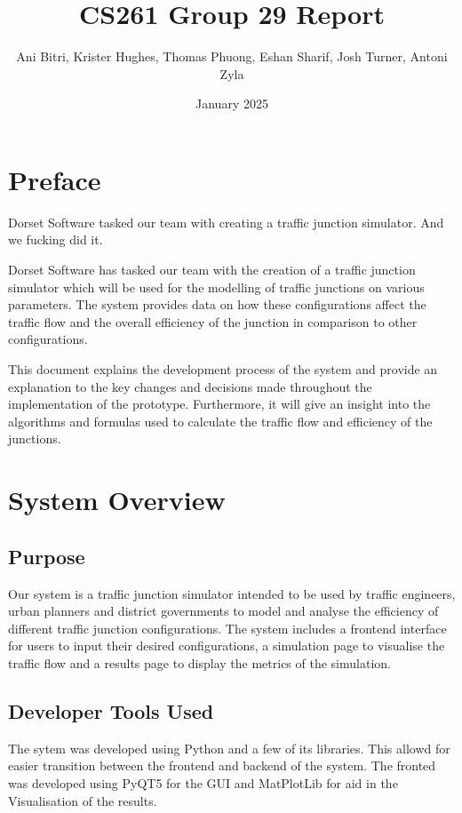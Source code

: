\documentclass{article}
\title{\vspace{-1.5cm}CS261 Group 29 Report}
\author{Ani Bitri, Krister Hughes, Thomas Phuong, Eshan Sharif, Josh Turner, Antoni Zyla}
\date{January 2025}
\begin{document}
\maketitle

\section{Preface}

Dorset Software tasked our team with creating a traffic junction simulator. And we fucking did it. 

Dorset Software has tasked our team with the creation of a traffic junction simulator which will be used for the modelling of traffic junctions on various parameters. The system provides data on how these configurations 
affect the traffic flow and the overall efficiency of the junction in comparison to other configurations. 

This document explains the development process of the system and provide an explanation to the key changes and decisions made throughout the implementation of the prototype. Furthermore,
it will give an insight into the algorithms and formulas used to calculate the traffic flow and efficiency of the junctions.

\section{System Overview}

    \subsection{Purpose}

        Our system is a traffic junction simulator intended to be used by traffic engineers, urban planners and district governments to model and analyse the efficiency of different traffic junction configurations. The
        system includes a frontend interface for users to input their desired configurations, a simulation page to visualise the traffic flow and a results page to display the metrics of the simulation.

    \subsection{Developer Tools Used}

        The sytem was developed using Python and a few of its libraries. This allowd for easier transition between the frontend and backend of the system. The
        fronted was developed using PyQT5 for the GUI and MatPlotLib for aid in the Visualisation of the results. 
\end{document}
